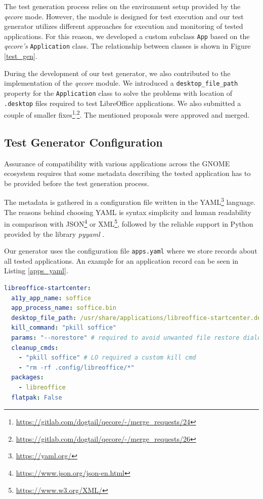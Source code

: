 The test generation process relies on the environment setup provided by the \textit{qecore} mode. However, the module is designed for test execution and our test generator utilizes different approaches for execution and monitoring of tested applications. For this reason, we developed a custom subclass \texttt{App} based on the \textit{qecore's} \texttt{Application} class. The relationship between classes is shown in Figure \ref{test_gen}. 

During the development of our test generator, we also contributed to the implementation of the \textit{qecore} module. We introduced a \texttt{desktop\_file\_path} property for the \texttt{Application} class to solve the problems with location of \texttt{.desktop} files required to test LibreOffice applications. We also submitted a couple of smaller
fixes\footnote{\url{https://gitlab.com/dogtail/qecore/-/merge_requests/24}}\textsuperscript{,}\footnote{\url{https://gitlab.com/dogtail/qecore/-/merge_requests/26}}. The mentioned proposals were approved and merged.


\subsection{Test Generator Configuration}\label{env_config}

Assurance of compatibility with various applications across the GNOME ecosystem requires that some metadata describing the tested application has to be provided before the test generation process. 

The metadata is gathered in a configuration file written in the YAML\footnote{\url{https://yaml.org/}} language. The reasons behind choosing YAML is syntax simplicity and human readability in comparison with JSON\footnote{\url{https://www.json.org/json-en.html}} or XML\footnote{\url{https://www.w3.org/XML/}}, followed by the reliable support in Python provided by the library \textit{pyyaml} \cite{yaml}.

Our generator uses the configuration file \texttt{apps.yaml} where we store records about all tested applications. An example for an application record can be seen in Listing \ref{apps_yaml}. 

\begin{lstlisting}[language=yaml,caption={
An example of the apps.yaml entry for LibreOffice StartCenter},label={apps_yaml}]
libreoffice-startcenter:
  a11y_app_name: soffice
  app_process_name: soffice.bin
  desktop_file_path: /usr/share/applications/libreoffice-startcenter.desktop
  kill_command: "pkill soffice"
  params: "--norestore" # required to avoid unwanted file restore dialogs
  cleanup_cmds:
    - "pkill soffice" # LO required a custom kill cmd
    - "rm -rf .config/libreoffice/*"
  packages:
    - libreoffice
  flatpak: False
\end{lstlisting}


